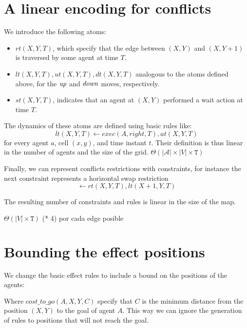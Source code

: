 \section{A linear encoding for conflicts}
We introduce the following atoms:
\begin{itemize}
    \item $rt(X,Y,T)$, which specify that the edge between $(X,Y)$ and $(X,Y+1)$ is traversed by some agent at time $T$.
    \item $lt(X,Y,T),ut(X,Y,T),dt(X,Y,T)$ analogous to the atoms defined above, for the $\mathit{up}$ and $\mathit{down}$ moves, respectively.
    \item $st(X,Y,T)$, indicates that an agent at $(X,Y)$ performed a wait action at time $T$.
\end{itemize}

The dynamics of these atoms are defined using basic rules like:
\[lt(X,Y,T) \leftarrow exec(A,right,T), at(X,Y,T)\]
for every agent $a$, cell $(x,y)$, and time instant $t$. Their definition is thus linear in the number of agents and the size of the grid.
$\Theta( |\mathcal{A}| \times |V| \times \mathtt{T})$

Finally, we can represent conflicts restrictions with constraints, for instance the next constraint represents a horizontal swap restriction
\[\leftarrow rt(X,Y,T),lt(X+1,Y,T)\]

The resulting number of constraints and rules is linear in the size of the map.

$\Theta(|V| \times \mathtt{T})$ (* 4) por cada edge posible

\section{Bounding the effect positions}
We change the basic effect rules to include a bound on the positions of the agents:

Where $cost\_to\_go(A,X,Y,C)$ specify that $C$ is the minimum distance from the position $(X,Y)$ to the goal of agent $A$. This way we can ignore the generation of rules to positions that will not reach the goal.
